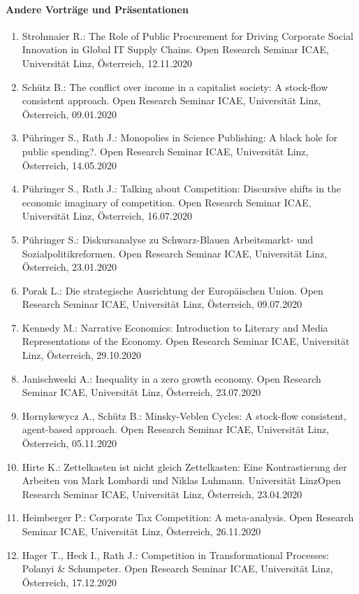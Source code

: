 \paragraph{Andere Vorträge und Präsentationen}
\begin{enumerate}
	\item Strohmaier R.: The Role of Public Procurement for Driving Corporate Social Innovation in Global IT Supply Chains. Open Research Seminar ICAE, Universität Linz, Österreich, 12.11.2020
	\item Schütz B.: The conflict over income in a capitalist society: A stock-flow consistent approach. Open Research Seminar ICAE, Universität Linz, Österreich, 09.01.2020
	\item Pühringer S., Rath J.: Monopolies in Science Publishing: A black hole for public spending?. Open Research Seminar ICAE, Universität Linz, Österreich, 14.05.2020
	\item Pühringer S., Rath J.: Talking about Competition: Discursive shifts in the economic imaginary of competition. Open Research Seminar ICAE, Universität Linz, Österreich, 16.07.2020
	\item Pühringer S.: Diskursanalyse zu Schwarz-Blauen Arbeitsmarkt- und Sozialpolitikreformen. Open Research Seminar ICAE, Universität Linz, Österreich, 23.01.2020
	\item Porak L.: Die strategische Ausrichtung der Europäischen Union. Open Research Seminar ICAE, Universität Linz, Österreich, 09.07.2020
	\item Kennedy M.: Narrative Economics: Introduction to Literary and Media Representations of the Economy. Open Research Seminar ICAE, Universität Linz, Österreich, 29.10.2020
	\item Janischweski A.: Inequality in a zero growth economy. Open Research Seminar ICAE, Universität Linz, Österreich, 23.07.2020
	\item Hornykewycz A., Schütz B.: Minsky-Veblen Cycles: A stock-flow consistent, agent-based approach. Open Research Seminar ICAE, Universität Linz, Österreich, 05.11.2020
	\item Hirte K.: Zettelkasten ist nicht gleich Zettelkasten: Eine Kontrastierung  der Arbeiten von Mark Lombardi und Niklas Luhmann. Universität LinzOpen Research Seminar ICAE, Universität Linz, Österreich, 23.04.2020
	\item Heimberger P.: Corporate Tax Competition: A meta-analysis. Open Research Seminar ICAE, Universität Linz, Österreich, 26.11.2020
	\item Hager T., Heck I., Rath J.: Competition in Transformational Processes: Polanyi \& Schumpeter. Open Research Seminar ICAE, Universität Linz, Österreich, 17.12.2020

\end{enumerate}
